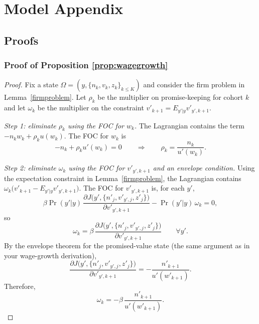 \appendix
\section{Model Appendix} 
\subsection{Proofs}

\subsubsection*{Proof of Proposition \ref{prop:wagegrowth}}\label{proof:wagegrowth}
\begin{proof}
Fix a state $\Omega=(y,\{n_k,v_k,z_k\}_{k\le K})$ and consider the firm problem in Lemma~\ref{firmproblem}.
Let $\rho_k$ be the multiplier on promise-keeping for cohort $k$ and let $\omega_k$ be the multiplier on the
constraint $v'_{k+1}=E_{y'|y}v'_{y',k+1}$.

\medskip
\noindent\textit{Step 1: eliminate $\rho_k$ using the FOC for $w_k$.}
The Lagrangian contains the term $-n_kw_k+\rho_k u(w_k)$. The FOC for $w_k$ is
\[
-n_k+\rho_k u'(w_k)=0
\qquad\Rightarrow\qquad
\rho_k=\frac{n_k}{u'(w_k)}.
\]

\medskip
\noindent\textit{Step 2: eliminate $\omega_k$ using the FOC for $v'_{y',k+1}$ and an envelope condition.}
Using the expectation constraint in Lemma~\ref{firmproblem}, the Lagrangian contains
$\omega_k\big(v'_{k+1}-E_{y'|y}v'_{y',k+1}\big)$.
The FOC for $v'_{y',k+1}$ is, for each $y'$,
\[
\beta \Pr(y'|y)\,\frac{\partial J\big(y',\{n'_j,v'_{y',j},z'_j\}\big)}{\partial v'_{y',k+1}}
-\Pr(y'|y)\,\omega_k
=0,
\]
so
\[
\omega_k=\beta\,\frac{\partial J\big(y',\{n'_j,v'_{y',j},z'_j\}\big)}{\partial v'_{y',k+1}}
\qquad \forall y'.
\]
By the envelope theorem for the promised-value state (the same argument as in your wage-growth derivation),
\[
\frac{\partial J\big(y',\{n'_j,v'_{y',j},z'_j\}\big)}{\partial v'_{y',k+1}}
=
-\frac{n'_{k+1}}{u'(w'_{k+1})}.
\]
Therefore,
\[
\omega_k=-\beta\,\frac{n'_{k+1}}{u'(w'_{k+1})}.
\]


\end{proof}
